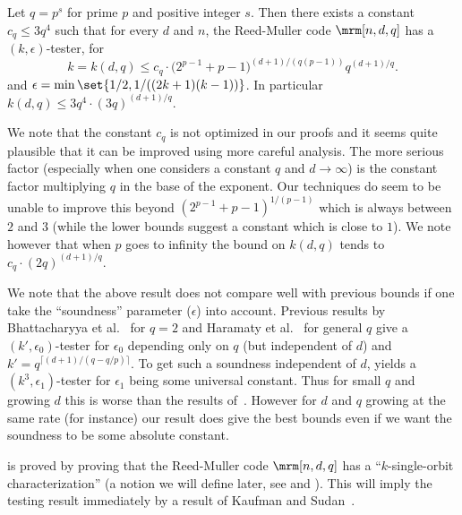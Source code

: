 \begin{theorem}[Main]\label{thm:main-imp}
Let $q = p^s$ for prime $p$ and positive integer $s$.
Then there exists a constant $c_q \leq 3q^4$ such that for every
$d$ and $n$,
the Reed-Muller code $\mrm[n,d,q]$
has a $(k,\epsilon)$-tester, for 
\[k = k(d,q) \leq c_q \cdot  \big(2^{p-1}+p-1\big)^{ (d+1)/(q(p-1))} q^{(d+1)/q}.\]
and $\epsilon = \min\set{1/2, {1}/{((2k+1)(k-1))}    }$.
In particular $k(d,q) \leq 3q^4 \cdot (3q)^{(d+1)/q}$.
\end{theorem}



We note that the constant $c_q$ is not optimized in our proofs and
it seems quite plausible that it can be improved using more careful
analysis. The more serious factor (especially when one considers a
constant $q$ and $d \to \infty$) is the constant factor multiplying $q$
in the base of the exponent. Our techniques do seem to be unable
to improve this beyond $(2^{p-1}+p-1)^{1/(p-1)}$ which is always
between $2$ and $3$ (while the lower bounds suggest a constant
which is close to $1$). We note however that when $p$ goes to infinity the
bound on $k(d,q)$ tends to $c_q \cdot (2q)^{(d+1)/q}$.

We note  that the above result does not compare well with previous
bounds if one take the ``soundness'' parameter ($\epsilon$) into account. 
Previous results by Bhattacharyya et al.~\cite{BKSSZ} for $q=2$
and Haramaty et al.~\cite{HSS11} for general $q$ give a 
$(k',\epsilon_0)$-tester for $\epsilon_0$ depending only
on $q$ (but independent of $d$)
and $k' = q^{\lceil {(d+1)}/{(q - q/p)} \rceil}$. To get such a
soundness independent of $d$,  yields
a $(k^3,\epsilon_1)$-tester for $\epsilon_1$ being some
universal constant. Thus for small $q$ and growing $d$ this is
worse than the results of~\cite{BKSSZ,HSS11}. However for $d$ and
$q$ growing at the same rate (for instance) our result does give
the best bounds even if we want the soundness to be some absolute
constant.

 is proved by proving that the
Reed-Muller code $\mrm[n,d,q]$ has a ``$k$-single-orbit characterization''
(a notion we will define later, see  and
). This will imply the testing result
immediately by a result of Kaufman and Sudan~\cite{KS08}.
